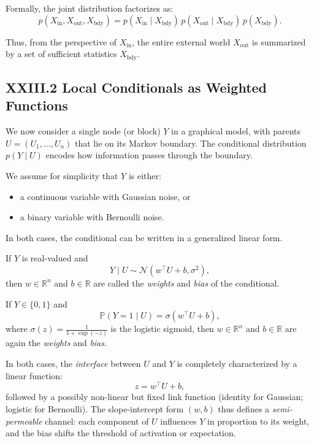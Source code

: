 \documentclass[12pt,letterpaper]{article}
\begin{document}
Formally, the joint distribution factorizes as:
\[
p(X_{\text{in}}, X_{\text{out}}, X_{\text{bdy}})
= p(X_{\text{in}} \mid X_{\text{bdy}})\, p(X_{\text{out}} \mid X_{\text{bdy}})\, p(X_{\text{bdy}}).
\]

Thus, from the perspective of $X_{\text{in}}$, the entire external world $X_{\text{out}}$ is summarized by a set of sufficient statistics $X_{\text{bdy}}$.

\subsection{XXIII.2 Local Conditionals as Weighted Functions}

We now consider a single node (or block) $Y$ in a graphical model, with parents $U = (U_1, \dots, U_n)$ that lie on its Markov boundary. The conditional distribution $p(Y \mid U)$ encodes how information passes through the boundary.

We assume for simplicity that $Y$ is either:

\begin{itemize}
  \item a continuous variable with Gaussian noise, or
  \item a binary variable with Bernoulli noise.
\end{itemize}

In both cases, the conditional can be written in a generalized linear form.

\begin{definition}
If $Y$ is real-valued and
\[
Y \mid U \sim \mathcal{N}(w^\top U + b, \sigma^2),
\]
then $w \in \mathbb{R}^n$ and $b \in \mathbb{R}$ are called the \emph{weights} and \emph{bias} of the conditional.
\end{definition}

\begin{definition}
If $Y \in \{0,1\}$ and
\[
\mathbb{P}(Y=1 \mid U) = \sigma(w^\top U + b),
\]
where $\sigma(z) = \frac{1}{1+\exp(-z)}$ is the logistic sigmoid, then $w \in \mathbb{R}^n$ and $b \in \mathbb{R}$ are again the \emph{weights} and \emph{bias}.
\end{definition}

In both cases, the \emph{interface} between $U$ and $Y$ is completely characterized by a linear function:
\[
z = w^\top U + b,
\]
followed by a possibly non-linear but fixed link function (identity for Gaussian; logistic for Bernoulli). The slope-intercept form $(w, b)$ thus defines a \emph{semi-permeable} channel: each component of $U$ influences $Y$ in proportion to its weight, and the bias shifts the threshold of activation or expectation.
\end{document}

